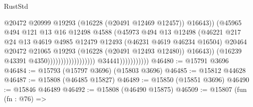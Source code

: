 \begin{lexlean}{RustStd}
\begin{coremodule}
                                                              @20472
                                                              @20999
                                                              @19293
                                                              (@16228 (@20491 @12469 @12457))
                                                              @16643))
                                                          (@45965
                                                            @494
                                                            @121
                                                            @13
                                                            @16
                                                            @12498
                                                            @4588
                                                            (@45973
                                                              @494
                                                              @13
                                                              @12498
                                                              (@46221
                                                                @217
                                                                @24
                                                                @13
                                                                @4619
                                                                @4985
                                                                @12479
                                                                @12493
                                                                (@46231 @4619 @46234 @16504)
                                                                @20464
                                                                @20472
                                                                @21065
                                                                @19293
                                                                (@16228 (@20491 @12493 @12480))
                                                                @16643))
                                                            (@16239 @43391 @4350))))))))))))))))))
                          @34441)))))))))))
@46480 := @15791 @3696
@46484 := @15793 (@15797 @3696) (@15803 @3696)
@46485 := @15812 @44628
@46487 := @15808 (@46485 @15827)
@46489 := @15850 (@15851 @3696)
@46490 := @15846 @46489
@46492 := @15808 (@46490 @15875)
@46509 := @15807
    (fun (fn : @76) =>

\end{coremodule}
\end{lexlean}
